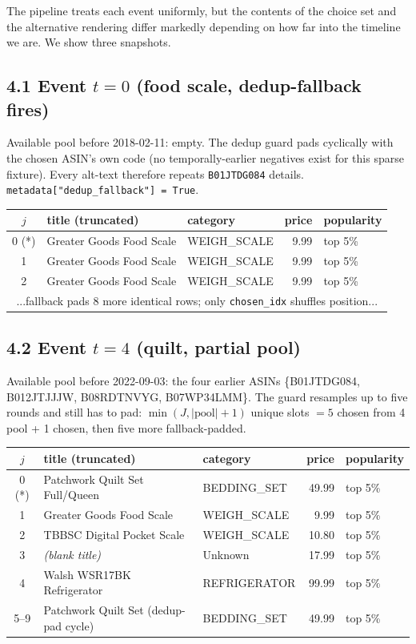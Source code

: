 \documentclass[11pt,a4paper]{article}
\begin{document}
The pipeline treats each event uniformly, but the contents of the
choice set and the alternative rendering differ markedly depending on
how far into the timeline we are. We show three snapshots.

\subsection*{4.1 Event $t = 0$ (food scale, dedup-fallback fires)}

Available pool before 2018-02-11: empty. The dedup guard pads
cyclically with the chosen ASIN's own code (no temporally-earlier
negatives exist for this sparse fixture). Every alt-text therefore
repeats \texttt{B01JTDG084} details.
\texttt{metadata["dedup\_fallback"] = True}.

\begin{center}\footnotesize
\begin{tabular}{c l l r l}\toprule
$j$ & title (truncated) & category & price & popularity \\ \midrule
0 (*) & Greater Goods Food Scale & WEIGH\_SCALE & 9.99 & top 5\% \\
1     & Greater Goods Food Scale & WEIGH\_SCALE & 9.99 & top 5\% \\
2     & Greater Goods Food Scale & WEIGH\_SCALE & 9.99 & top 5\% \\
\multicolumn{5}{c}{...fallback pads 8 more identical rows;
 only \texttt{chosen\_idx} shuffles position...} \\
\bottomrule
\end{tabular}\end{center}

\subsection*{4.2 Event $t = 4$ (quilt, partial pool)}

Available pool before 2022-09-03: the four earlier ASINs
\{B01JTDG084, B012JTJJJW, B08RDTNVYG, B07WP34LMM\}. The guard resamples
up to five rounds and still has to pad: $\min(J, |\text{pool}| + 1)$
unique slots $= 5$ chosen from 4 pool + 1 chosen, then five more
fallback-padded.

\begin{center}\footnotesize
\begin{tabular}{c l l r l}\toprule
$j$ & title (truncated) & category & price & popularity \\ \midrule
0 (*) & Patchwork Quilt Set Full/Queen & BEDDING\_SET  & 49.99 & top 5\% \\
1     & Greater Goods Food Scale       & WEIGH\_SCALE  &  9.99 & top 5\% \\
2     & TBBSC Digital Pocket Scale     & WEIGH\_SCALE  & 10.80 & top 5\% \\
3     & \emph{(blank title)}           & Unknown       & 17.99 & top 5\% \\
4     & Walsh WSR17BK Refrigerator     & REFRIGERATOR  & 99.99 & top 5\% \\
5--9  & Patchwork Quilt Set (dedup-pad cycle) & BEDDING\_SET & 49.99 & top 5\% \\
\bottomrule
\end{tabular}\end{center}
\end{document}
